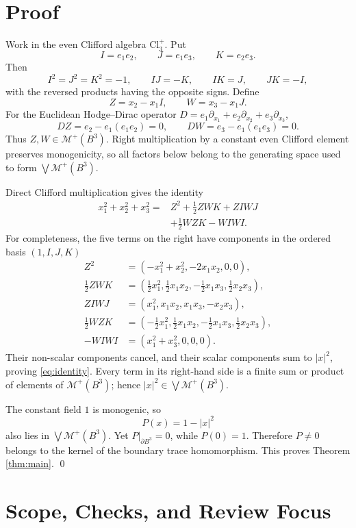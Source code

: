 \documentclass[11pt]{article}
\newcommand{\Cl}{\mathrm{Cl}_3^+}
\newcommand{\M}{\mathcal M^+}
\newcommand{\A}{\bigvee\!\M(B^3)}
\begin{document}
\section*{Proof}

Work in the even Clifford algebra \(\Cl\).  Put
\[
 I=e_1e_2,\qquad J=e_1e_3,\qquad K=e_2e_3.
\]
Then
\[
 I^2=J^2=K^2=-1,\qquad IJ=-K,\qquad IK=J,
 \qquad JK=-I,
\]
with the reversed products having the opposite signs.  Define
\[
 Z=x_2-x_1I,
 \qquad
 W=x_3-x_1J.
\]
For the Euclidean Hodge--Dirac operator
\(D=e_1\partial_{x_1}+e_2\partial_{x_2}+e_3\partial_{x_3}\),
\[
 DZ=e_2-e_1(e_1e_2)=0,
 \qquad
 DW=e_3-e_1(e_1e_3)=0.
\]
Thus \(Z,W\in\M(B^3)\).  Right multiplication by a constant even Clifford
element preserves monogenicity, so all factors below belong to the generating
space used to form \(\A\).

Direct Clifford multiplication gives the identity
\begin{equation}\label{eq:identity}
\begin{split}
 x_1^2+x_2^2+x_3^2
 ={}&Z^2+\frac12ZWK+ZIWJ\\
    &+\frac12WZK-WIWI.
\end{split}
\end{equation}
For completeness, the five terms on the right have components in the ordered
basis \((1,I,J,K)\)
\begin{align*}
Z^2&=(-x_1^2+x_2^2,-2x_1x_2,0,0),\\
\tfrac12ZWK&=(\tfrac12x_1^2,\tfrac12x_1x_2,
              -\tfrac12x_1x_3,\tfrac12x_2x_3),\\
ZIWJ&=(x_1^2,x_1x_2,x_1x_3,-x_2x_3),\\
\tfrac12WZK&=(-\tfrac12x_1^2,\tfrac12x_1x_2,
              -\tfrac12x_1x_3,\tfrac12x_2x_3),\\
-WIWI&=(x_1^2+x_3^2,0,0,0).
\end{align*}
Their non-scalar components cancel, and their scalar components sum to
\(|x|^2\), proving \eqref{eq:identity}.  Every term in its right-hand side is
a finite sum or product of elements of \(\M(B^3)\); hence
\(|x|^2\in\A\).

The constant field \(1\) is monogenic, so
\[
                         P(x)=1-|x|^2
\]
also lies in \(\A\).  Yet \(P|_{\partial B^3}=0\), while \(P(0)=1\).
Therefore \(P\neq0\) belongs to the kernel of the boundary trace
homomorphism.  This proves Theorem \ref{thm:main}. \qed

\section*{Scope, Checks, and Review Focus}
\end{document}
